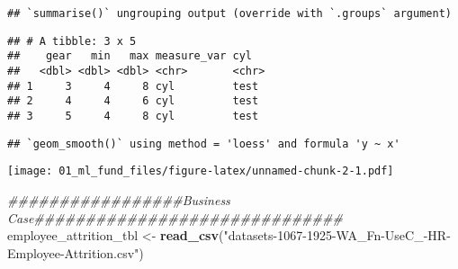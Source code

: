 \documentclass[
]{article}
\newenvironment{Shaded}{\begin{snugshade}}{\end{snugshade}}
\newcommand{\CommentTok}[1]{\textcolor[rgb]{0.56,0.35,0.01}{\textit{#1}}}
\newcommand{\ControlFlowTok}[1]{\textcolor[rgb]{0.13,0.29,0.53}{\textbf{#1}}}
\newcommand{\DataTypeTok}[1]{\textcolor[rgb]{0.13,0.29,0.53}{#1}}
\newcommand{\KeywordTok}[1]{\textcolor[rgb]{0.13,0.29,0.53}{\textbf{#1}}}
\newcommand{\NormalTok}[1]{#1}
\newcommand{\OperatorTok}[1]{\textcolor[rgb]{0.81,0.36,0.00}{\textbf{#1}}}
\newcommand{\StringTok}[1]{\textcolor[rgb]{0.31,0.60,0.02}{#1}}
\begin{document}
\begin{verbatim}
## `summarise()` ungrouping output (override with `.groups` argument)
\end{verbatim}

\begin{verbatim}
## # A tibble: 3 x 5
##    gear   min   max measure_var cyl  
##   <dbl> <dbl> <dbl> <chr>       <chr>
## 1     3     4     8 cyl         test 
## 2     4     4     6 cyl         test 
## 3     5     4     8 cyl         test
\end{verbatim}

\begin{Shaded}
\end{Shaded}

\begin{verbatim}
## `geom_smooth()` using method = 'loess' and formula 'y ~ x'
\end{verbatim}

\texttt{[image: 01\_ml\_fund\_files/figure-latex/unnamed-chunk-2-1.pdf]}

\begin{Shaded}
\begin{Highlighting}[]
\CommentTok{#################Business Case##############################}
\NormalTok{employee_attrition_tbl <-}\StringTok{ }\KeywordTok{read_csv}\NormalTok{(}\StringTok{"datasets-1067-1925-WA_Fn-UseC_-HR-Employee-Attrition.csv"}\NormalTok{)}
\end{Highlighting}
\end{Shaded}
\end{document}
